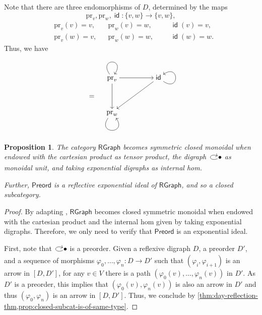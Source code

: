 \documentclass[12pt,dvipsnames,oneside]{amsart}
\theoremstyle{plain}
\newtheorem{proposition}{Proposition}[section]
\theoremstyle{remark}
\theoremstyle{definition}
\DeclareMathOperator{\id}{\mathsf{id}}
\newcommand*{\from}{\colon}
\newcommand{\preord}{\mathsf{Preord}}
\newcommand{\rgraph}{\mathsf{RGraph}}
\begin{document}
\begin{example}
  Note that there are three endomorphisms of \(D\), determined by the maps
  \[
    \mathrm{pr}_{v}, \mathrm{pr}_{w}, \id \from\{v,w\} \to\{v,w\},
  \]
  \begin{align*}
    &\mathrm{pr}_{v}(v) = v, &&\mathrm{pr}_{w}(v)= w, &&&\id(v) = v, \\
    &\mathrm{pr}_{v}(w) = v, &&\mathrm{pr}_{w}(w)= w, &&&\id(w) = w.
  \end{align*}
  Thus, we have
  \begin{equation*}
    [D,D] \quad = \begin{gathered}\begin{tikzcd}[ampersand replacement=\&,cramped]
      {\mathrm{pr}_v} \&\& \id \\
      \\
      {\mathrm{pr}_w}
      \arrow[from=1-1, to=1-1, loop, in=55, out=125, distance=10mm]
      \arrow[from=1-1, to=1-3]
      \arrow[from=1-1, to=3-1]
      \arrow[from=1-3, to=1-3, loop, in=35, out=325, distance=10mm]
      \arrow[from=1-3, to=3-1]
      \arrow[from=3-1, to=3-1, loop, in=305, out=235, distance=10mm]
    \end{tikzcd}\end{gathered}\qedhere
  \end{equation*}
\end{example}

\begin{proposition}\label{prop:RGraph_symm_closed_mon}
  The category \(\rgraph\) becomes symmetric closed monoidal when endowed with the cartesian product as tensor product, the digraph \(\!\!\bulletrefldig\!\!\) as monoidal unit, and taking exponential digraphs as internal hom.

  Further, \(\preord\) is a reflective exponential ideal of \(\rgraph\), and so a closed subcategory.
\end{proposition}
\begin{proof}
  By adapting \cite[Proposition~2.5]{Kapulkin-Kershaw}, \(\rgraph\) becomes closed symmetric monoidal when endowed with the cartesian product and the internal hom given by taking exponential digraphs. Therefore, we only need to verify that \(\preord\) is an exponential ideal.

  First, note that \(\!\!\bulletrefldig\!\!\) is a preorder.
  Given a reflexive digraph \(D\), a preorder \(D'\), and a sequence of morphisms \(\varphi_{0}, \dots , \varphi_{n} \from D \to D'\) such that \((\varphi_{i}, \varphi_{i+1})\) is an arrow in \([D, D']\), for any \(v \in V\) there is a path \((\varphi_{0}(v), \dots , \varphi_{n}(v))\) in \(D'\).
  As \(D'\) is a preorder, this implies that \((\varphi_{0}(v), \varphi_{n}(v))\) is also an arrow in \(D'\) and thus \((\varphi_{0}, \varphi_{n})\) is an arrow in \([D,D']\).
  Thus, we conclude by \cref{thm:day-reflection-thm,prop:closed-subcat-is-of-same-type}.
\end{proof}
\end{document}
